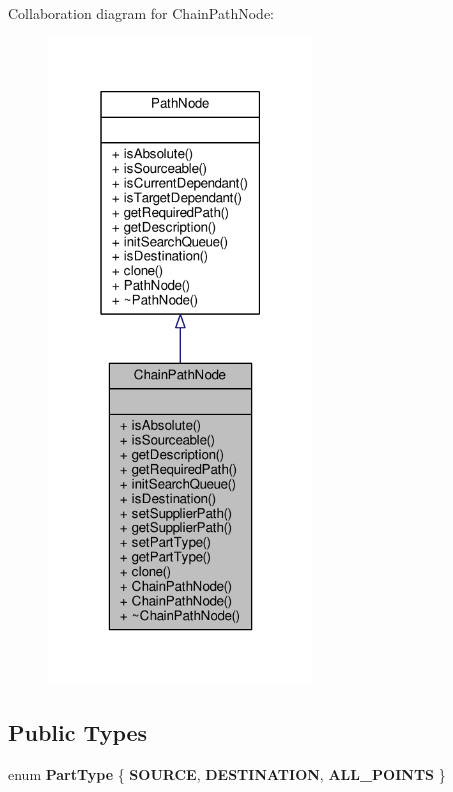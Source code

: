 Collaboration diagram for Chain\+Path\+Node\+:
\nopagebreak
\begin{figure}[H]
\begin{center}
\leavevmode
\includegraphics[width=199pt]{d0/dcf/classChainPathNode__coll__graph}
\end{center}
\end{figure}
\subsection*{Public Types}
\begin{DoxyCompactItemize}
\item 
enum {\bfseries Part\+Type} \{ {\bfseries S\+O\+U\+R\+CE}, 
{\bfseries D\+E\+S\+T\+I\+N\+A\+T\+I\+ON}, 
{\bfseries A\+L\+L\+\_\+\+P\+O\+I\+N\+TS}
 \}\hypertarget{classChainPathNode_add81b3fc52e9012a66a5fd39505294ed}{}\label{classChainPathNode_add81b3fc52e9012a66a5fd39505294ed}

\end{DoxyCompactItemize}
